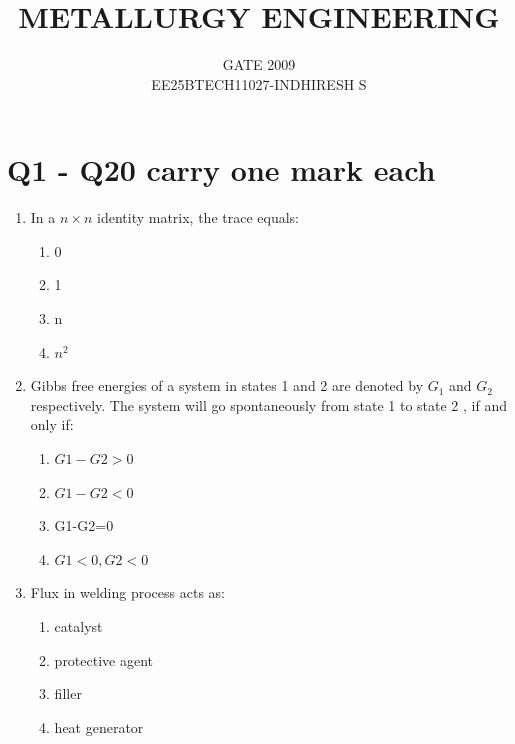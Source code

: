 \documentclass[journal]{IEEEtran}
\theoremstyle{remark}
\begin{document}

\onecolumn

\title{METALLURGY ENGINEERING}
\author{GATE 2009\\
EE25BTECH11027-INDHIRESH S}
\maketitle


\renewcommand{\thefigure}{\theenumi}
\renewcommand{\thetable}{\theenumi}

\section{Q1 - Q20 carry one mark each}
\begin{enumerate}
\item  In a $n\times n $ identity matrix, the trace equals: \hfill{}

\begin{multicols}{4}
\begin{enumerate}
\item 0
\item 1
\item n
\item $n^2$
\end{enumerate}
\end{multicols}

\item  Gibbs free energies of a system in states 1 and 2 are denoted by $G_1$ and $G_2$ respectively. The system will go spontaneously from state 1 to state 2 , if and only if: \hfill{}
\begin{multicols}{4}
\begin{enumerate}
\item $G1-G2>0$
\item $G1-G2<0$
\item G1-G2=0
\item $G1<0 , G2<0$
\end{enumerate}
\end{multicols}

\item Flux in welding process acts as:
\hfill{}
\begin{multicols}{2}
\begin{enumerate}
\item catalyst
\item protective agent
\item filler
\item heat generator
\end{enumerate}
\end{multicols}


\end{enumerate}
\end{document}
